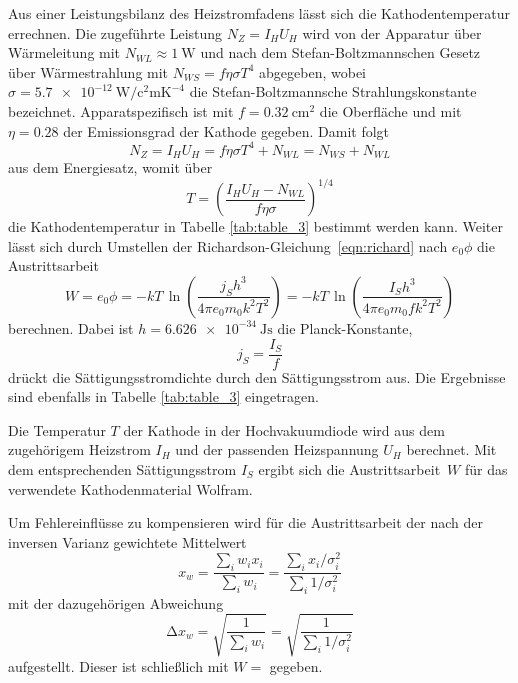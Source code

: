 Aus einer Leistungsbilanz des Heizstromfadens lässt sich die Kathodentemperatur errechnen. Die zugeführte Leistung
$N_Z = I_H U_H$ wird von der Apparatur über Wärmeleitung mit $N_{WL} \approx \qty{1}{\watt}$ und nach dem
Stefan-Boltzmannschen Gesetz über Wärmestrahlung mit $N_{WS} = f \eta \sigma T^4$ abgegeben, wobei
$\sigma = \qty{5.7e-12}{\watt\per\square\centi\meter\kelvin\tothe{-4}}$ die Stefan-Boltzmannsche
Strahlungskonstante bezeichnet. Apparatspezifisch ist mit $f = \qty{0.32}{\centi\meter\squared}$ die Oberfläche und mit
$\eta = \num{0.28}$ der Emissionsgrad der Kathode gegeben. Damit folgt
\begin{equation*}
	N_Z = I_H U_H = f \eta \sigma T^4 + N_{WL} = N_{WS} + N_{WL}
\end{equation*}
aus dem Energiesatz, womit über
\begin{equation*}
	T = \left( \frac{I_H U_H - N_{WL}}{f \eta \sigma} \right)^{\!\! 1/4}
\end{equation*}
die Kathodentemperatur in Tabelle \ref{tab:table_3} bestimmt werden kann. Weiter lässt sich durch Umstellen der
Richardson-Gleichung~\eqref{eqn:richard} nach $e_0 \phi$ die Austrittsarbeit
\begin{equation*}
	W = e_0 \phi = -kT \, \ln \!\left( \frac{j_S h^3}{4\pi e_0 m_0 k^2 T^2} \right)
	= -kT \, \ln \!\left( \frac{I_S h^3}{4\pi e_0 m_0 f k^2 T^2} \right)
\end{equation*}
berechnen. Dabei ist $h = \qty{6.626e-34}{\joule\second}$ die Planck-Konstante,
\begin{equation*}
	j_S = \frac{I_S}{f}
\end{equation*}
drückt die Sättigungsstromdichte durch den Sättigungsstrom aus. Die Ergebnisse sind ebenfalls in Tabelle \ref{tab:table_3} eingetragen.

\begin{table}[H]
	\caption{Die Temperatur $T$ der Kathode in der Hochvakuumdiode wird aus dem zugehörigem Heizstrom $I_H$ und der passenden
			 Heizspannung $U_H$ berechnet. Mit dem entsprechenden Sättigungsstrom $I_S$ ergibt sich die Austrittsarbeit~$W$ für
			 das verwendete Kathodenmaterial Wolfram.}
	\centering
	
	\label{tab:table_3}
\end{table}

Um Fehlereinflüsse zu kompensieren wird für die Austrittsarbeit der nach der inversen Varianz gewichtete Mittelwert
\begin{equation*}
	x_w = \frac{\sum_i w_i x_i}{\sum_i w_i} = \frac{\sum_i x_i / \sigma_i^2}{\sum_i 1/\sigma_i^2}
\end{equation*}
mit der dazugehörigen Abweichung
\begin{equation*}
	\increment x_w = \sqrt{\frac{1}{\sum_i w_i}} = \sqrt{\frac{1}{\sum_i 1/\sigma_i^2}}
\end{equation*}
aufgestellt. Dieser ist schließlich mit $W = $ gegeben.

